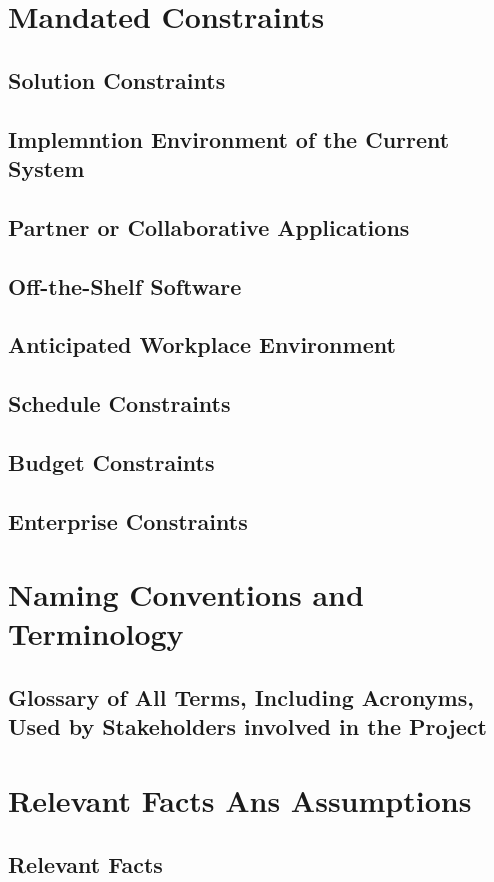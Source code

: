 \documentclass[]{article}
\begin{document}
\section{Mandated Constraints}
\subsection{Solution Constraints}
\subsection{Implemntion Environment of the Current System}
\subsection{Partner or Collaborative Applications}
\subsection{Off-the-Shelf Software}
\subsection{Anticipated Workplace Environment}
\subsection{Schedule Constraints}
\subsection{Budget Constraints}
\subsection{Enterprise Constraints}

\section{Naming Conventions and Terminology}
\subsection{Glossary of All Terms, Including Acronyms, Used by Stakeholders involved in the Project}

\section{Relevant Facts Ans Assumptions}
\subsection{Relevant Facts}
\end{document}
